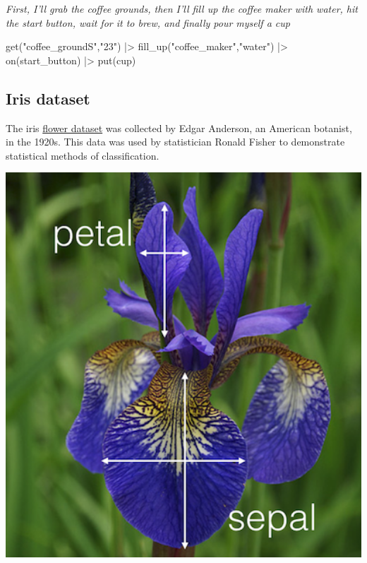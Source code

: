 \documentclass[
  letterpaper,
  DIV=11,
  numbers=noendperiod,
  oneside]{scrartcl}
\newenvironment{Shaded}{\begin{snugshade}}{\end{snugshade}}
\newcommand{\FunctionTok}[1]{\textcolor[rgb]{0.28,0.35,0.67}{#1}}
\newcommand{\NormalTok}[1]{\textcolor[rgb]{0.00,0.23,0.31}{#1}}
\newcommand{\SpecialCharTok}[1]{\textcolor[rgb]{0.37,0.37,0.37}{#1}}
\newcommand{\StringTok}[1]{\textcolor[rgb]{0.13,0.47,0.30}{#1}}
\begin{document}
\emph{First, I'll grab the coffee grounds, then I'll fill up the coffee
maker with water, hit the start button, wait for it to brew, and finally
pour myself a cup}

\begin{Shaded}
\begin{Highlighting}[]
\FunctionTok{get}\NormalTok{(}\StringTok{"coffee\_groundS"}\NormalTok{,}\StringTok{"23"}\NormalTok{)  }\SpecialCharTok{|\textgreater{}} 
  \FunctionTok{fill\_up}\NormalTok{(}\StringTok{"coffee\_maker"}\NormalTok{,}\StringTok{"water"}\NormalTok{)   }\SpecialCharTok{|\textgreater{}} 
  \FunctionTok{on}\NormalTok{(start\_button)  }\SpecialCharTok{|\textgreater{}} 
  \FunctionTok{put}\NormalTok{(cup)}
\end{Highlighting}
\end{Shaded}

\subsection{Iris dataset}\label{iris-dataset}

The iris
\href{https://en.wikipedia.org/wiki/Iris_flower_data_set}{flower
dataset} was collected by Edgar Anderson, an American botanist, in the
1920s. This data was used by statistician Ronald Fisher to demonstrate
statistical methods of classification.

\includegraphics[width=1\textwidth,height=\textheight]{Intro_R_files/mediabag/iris_flower.png}
\end{document}
